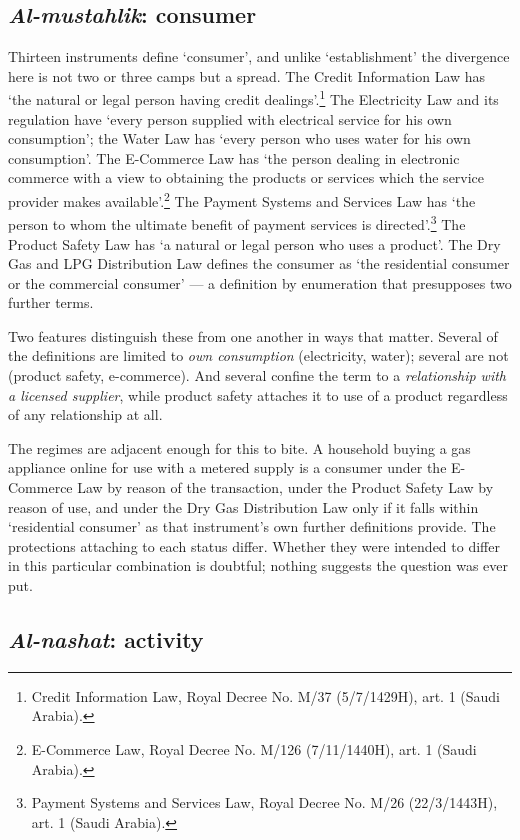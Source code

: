 \documentclass[11pt]{article}
\begin{document}
\subsection{\emph{Al-mustahlik}: consumer}

Thirteen instruments define `consumer', and unlike `establishment' the
divergence here is not two or three camps but a spread. The Credit
Information Law has `the natural or legal person having credit
dealings'.\footnote{Credit Information Law, Royal Decree No. M/37 (5/7/1429H), art. 1 (Saudi Arabia).} The Electricity Law and its regulation have `every person supplied with
electrical service for his own consumption'; the Water Law has `every person
who uses water for his own consumption'. The E-Commerce Law has `the person dealing
in electronic commerce with a view to obtaining the products or services
which the service provider makes available'.\footnote{E-Commerce Law, Royal Decree No. M/126 (7/11/1440H), art. 1 (Saudi Arabia).} The Payment Systems and Services Law has
`the person to whom the ultimate benefit of payment services is
directed'.\footnote{Payment Systems and Services Law, Royal Decree No. M/26 (22/3/1443H), art. 1 (Saudi Arabia).} The Product Safety Law has `a natural or legal person who
uses a product'. The Dry Gas and LPG Distribution Law defines the consumer as
`the residential consumer or the commercial consumer' --- a definition by
enumeration that presupposes two further terms.

Two features distinguish these from one another in ways that matter. Several
of the definitions are limited to \emph{own consumption} (electricity,
water); several are not (product safety, e-commerce). And several confine the
term to a \emph{relationship with a licensed supplier}, while product safety
attaches it to use of a product regardless of any relationship at all.

The regimes are adjacent enough for this to bite. A household buying a gas
appliance online for use with a metered supply is a consumer under the
E-Commerce Law by reason of the transaction, under the Product Safety Law by
reason of use, and under the Dry Gas Distribution Law only if it falls within
`residential consumer' as that instrument's own further definitions provide.
The protections attaching to each status differ. Whether they were intended
to differ in this particular combination is doubtful; nothing suggests the
question was ever put.

\subsection{\emph{Al-nashat}: activity}
\label{sec:nashat}
\end{document}
